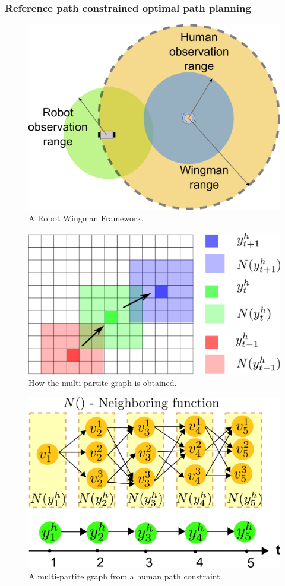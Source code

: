 \documentclass[phd]{byuprop}
\begin{document}
\subsubsection{Reference path constrained optimal path planning}

\begin{figure}[hbtp]
\centering
\includegraphics[width=0.5\linewidth]{./fig/Wingman.pdf}
\caption{A Robot Wingman Framework.}
\label{fig:Wingman}
\end{figure}

\begin{figure}[hbtp]
\centering
\includegraphics[width=0.6\linewidth]{./fig/humanConstraint}
\caption{How the multi-partite graph is obtained.}
\label{fig:humanConstraint}
\end{figure}

\begin{figure}[htbp]
\centering
\includegraphics[width=0.6\linewidth]{./fig/MultiPartite.pdf}
\caption{A multi-partite graph from a human path constraint.}
\label{fig:MultiPartite}
\end{figure}
\end{document}

